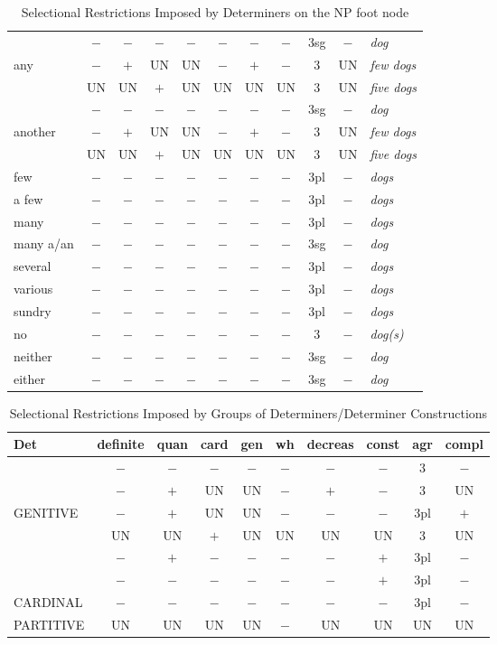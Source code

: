 \begin{table}
\begin{tabular}{|l||c|c|c|c|c|c|c|c|c||l|}
\hline
&$-$&$-$&$-$&$-$&$-$&$-$&$-$&3sg&$-$&{\it dog}\\
any&$-$&$+$&UN&UN&$-$&$+$&$-$&3&UN&{\it few dogs}\\
&UN&UN&$+$&UN&UN&UN&UN&3&UN&{\it five dogs}\\
\hline
&$-$&$-$&$-$&$-$&$-$&$-$&$-$&3sg&$-$&{\it dog}\\
another&$-$&$+$&UN&UN&$-$&$+$&$-$&3&UN&{\it few dogs}\\
&UN&UN&$+$&UN&UN&UN&UN&3&UN&{\it five dogs}\\
\hline
few&$-$&$-$&$-$&$-$&$-$&$-$&$-$&3pl&$-$&{\it dogs}\\
\hline
a few&$-$&$-$&$-$&$-$&$-$&$-$&$-$&3pl&$-$&{\it dogs}\\
\hline
many&$-$&$-$&$-$&$-$&$-$&$-$&$-$&3pl&$-$&{\it dogs}\\
\hline
many a/an&$-$&$-$&$-$&$-$&$-$&$-$&$-$&3sg&$-$&{\it dog}\\
\hline
several&$-$&$-$&$-$&$-$&$-$&$-$&$-$&3pl&$-$&{\it dogs}\\
\hline
various&$-$&$-$&$-$&$-$&$-$&$-$&$-$&3pl&$-$&{\it dogs}\\
\hline
sundry&$-$&$-$&$-$&$-$&$-$&$-$&$-$&3pl&$-$&{\it dogs}\\
\hline
no&$-$&$-$&$-$&$-$&$-$&$-$&$-$&3&$-$&{\it dog(s)}\\
\hline
neither&$-$&$-$&$-$&$-$&$-$&$-$&$-$&3sg&$-$&{\it dog}\\
\hline
either&$-$&$-$&$-$&$-$&$-$&$-$&$-$&3sg&$-$&{\it dog}\\
\hline
\end{tabular}
\caption{Selectional Restrictions Imposed by Determiners on the NP
foot node}
\label{det-ordering}
\end{table}

\begin{table}[htb]
\centering
\begin{tabular}{|l||c|c|c|c|c|c|c|c|c|}
\hline\hline
Det&definite&quan&card&gen&wh&decreas&const&agr&compl\\
\hline
\hline
&$-$&$-$&$-$&$-$&$-$&$-$&$-$&3&$-$\\
&$-$&$+$&UN&UN&$-$&$+$&$-$&3&UN\\
GENITIVE&$-$&$+$&UN&UN&$-$&$-$&$-$&3pl&$+$\\
&UN&UN&$+$&UN&UN&UN&UN&3&UN\\
&$-$&$+$&$-$&$-$&$-$&$-$&$+$&3pl&$-$\\
&$-$&$-$&$-$&$-$&$-$&$-$&$+$&3pl&$-$\\
\hline
CARDINAL&$-$&$-$&$-$&$-$&$-$&$-$&$-$&3pl\footnotemark&$-$\\
\hline
PARTITIVE&UN&UN&UN&UN&$-$&UN&UN&UN&UN\\
\hline
\end{tabular}
\caption{Selectional Restrictions Imposed by Groups of
Determiners/Determiner Constructions}
\label{det-ordering2}
\end{table}


